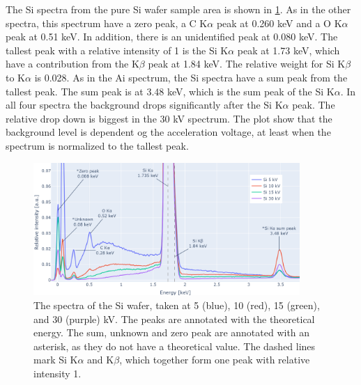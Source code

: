 The Si spectra from the pure Si wafer sample area is shown in \cref{fig:results:Spectra_Si}.
As in the other spectra, this spectrum have a zero peak, a C K$\alpha$ peak at 0.260 keV and a O K$\alpha$ peak at 0.51 keV.
In addition, there is an unidentified peak at 0.080 keV.
The tallest peak with a relative intensity of 1 is the Si K$\alpha$ peak at 1.73 keV, which have a contribution from the K$\beta$ peak at 1.84 keV.
The relative weight for Si K$\beta$ to K$\alpha$ is 0.028.
As in the Ai spectrum, the Si spectra have a sum peak from the tallest peak.
The sum peak is at 3.48 keV, which is the sum peak of the Si K$\alpha$.
In all four spectra the background drops significantly after the Si K$\alpha$ peak.
The relative drop down is biggest in the 30 kV spectrum.
The plot show that the background level is dependent og the acceleration voltage, at least when the spectrum is normalized to the tallest peak.


\begin{figure}[h!]
    \centering
    \includegraphics[width=0.90\textwidth]{figures/each_spectra/Si_everything.png}
    \caption{
        The spectra of the Si wafer, taken at 5 (blue), 10 (red), 15 (green), and 30 (purple) kV.
        The peaks are annotated with the theoretical energy.
        The sum, unknown and zero peak are annotated with an asterisk, as they do not have a theoretical value.
        The dashed lines mark Si K$\alpha$ and K$\beta$, which together form one peak with relative intensity 1.
    }
    \label{fig:results:Spectra_Si}
\end{figure}



